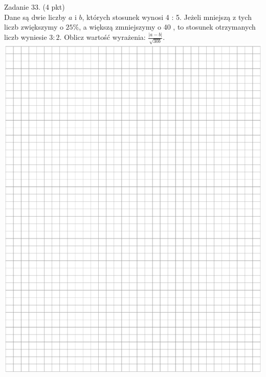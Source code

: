 \documentclass[10pt]{article}
\begin{document}
Zadanie 33. (4 pkt)\\
Dane są dwie liczby \(a\) i \(b\), których stosunek wynosi 4 : 5. Jeżeli mniejszą z tych liczb zwiększymy o \(25 \%\), a większą zmniejszymy o 40 , to stosunek otrzymanych liczb wyniesie \(3: 2\). Oblicz wartość wyrażenia: \(\frac{|a-b|}{\sqrt{30 b}}\).\\
\includegraphics[max width=\textwidth, center]{2024_11_21_23d228cacd5e4a9a3f86g-12}
\end{document}
